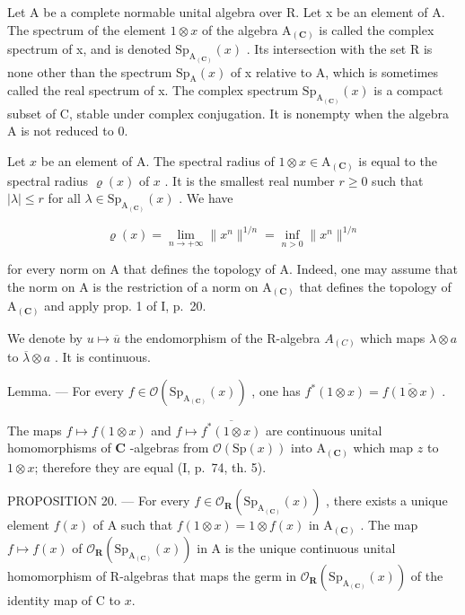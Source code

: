 Let A be a complete normable unital algebra over R. Let x be an element of A. The spectrum of the element \(1 \otimes x\) of the algebra \(\mathrm{A}_{(\mathbf{C})}\) is called the complex spectrum of x, and is denoted \(\mathrm{Sp}_{\mathrm{A}_{(\mathbf{C})}}(x)\) . Its intersection with the set R is none other than the spectrum \(\mathrm{Sp}_{\mathrm{A}}(x)\) of x relative to A, which is sometimes called the real spectrum of x. The complex spectrum \(\mathrm{Sp}_{\mathrm{A}_{(\mathbf{C})}}(x)\) is a compact subset of C, stable under complex conjugation. It is nonempty when the algebra A is not reduced to 0.

Let \(x\) be an element of A. The spectral radius of \(1 \otimes x \in \mathrm{A}_{(\mathbf{C})}\) is equal to the spectral radius \(\varrho(x)\) of \(x\) . It is the smallest real number \(r \geqslant 0\) such that \(|\lambda| \leqslant r\) for all \(\lambda \in \mathrm{Sp}_{\mathrm{A}_{(\mathbf{C})}}(x)\) . We have

\[
\varrho (x) = \lim _ {n \to + \infty} \| x ^ {n} \| ^ {1 / n} = \inf _ {n > 0} \| x ^ {n} \| ^ {1 / n}
\]

for every norm on A that defines the topology of A. Indeed, one may assume that the norm on A is the restriction of a norm on \(\mathrm{A}_{(\mathbf{C})}\) that defines the topology of \(\mathrm{A}_{(\mathbf{C})}\) and apply prop. 1 of I, p.~20.

We denote by \(u \mapsto \overline{u}\) the endomorphism of the R-algebra \(A_{(C)}\) which maps \(\lambda \otimes a\) to \(\overline{\lambda} \otimes a\) . It is continuous.

Lemma. --- For every \(f \in \mathcal{O}(\mathrm{Sp}_{\mathrm{A}_{(\mathbf{C})}}(x))\) , one has \(f^{*}(1 \otimes x) = \overline{f(1 \otimes x)}\) .

The maps \(f \mapsto f(1 \otimes x)\) and \(f \mapsto \overline{f^*(1 \otimes x)}\) are continuous unital homomorphisms of \(\mathbf{C}\) -algebras from \(\mathcal{O}(\mathrm{Sp}(x))\) into \(\mathrm{A}_{(\mathbf{C})}\) which map \(z\) to \(1 \otimes x\); therefore they are equal (I, p.~74, th. 5).

PROPOSITION 20. --- For every \(f \in \mathcal{O}_{\mathbf{R}}(\mathrm{Sp}_{\mathrm{A}_{(\mathbf{C})}}(x))\) , there exists a unique element \(f(x)\) of A such that \(f(1 \otimes x) = 1 \otimes f(x)\) in \(\mathrm{A}_{(\mathbf{C})}\) . The map \(f \mapsto f(x)\) of \(\mathcal{O}_{\mathbf{R}}(\mathrm{Sp}_{\mathrm{A}_{(\mathbf{C})}}(x))\) in A is the unique continuous unital homomorphism of R-algebras that maps the germ in \(\mathcal{O}_{\mathbf{R}}(\mathrm{Sp}_{\mathrm{A}_{(\mathbf{C})}}(x))\) of the identity map of C to \(x\).

